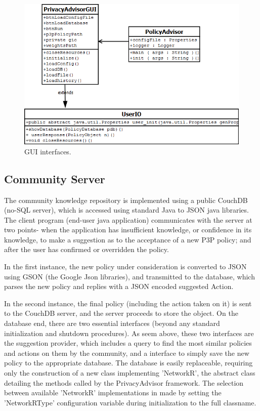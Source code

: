 \begin{figure}[htbp]
\begin{center}
\includegraphics[width = \textwidth]{DesignReport/uml/policyadvisorgui}
\caption{GUI interfaces.}
\label{GUI_interface}
\end{center}
\end{figure}



\subsection{Community Server} %
The community knowledge repository is implemented using a public CouchDB (no-SQL server), which is accessed using standard Java to JSON java libraries. The client program (end-user java application) communicates with the server at two points- when the application has insufficient knowledge, or confidence in its knowledge, to make a suggestion as to the acceptance of a new P3P policy; and after the user has confirmed or overridden the policy.

In the first instance, the new policy under consideration is converted to JSON using GSON (the Google Json libraries), and transmitted to the database, which parses the new policy and replies with a JSON encoded suggested Action.

In the second instance, the final policy (including the action taken on it) is sent to the CouchDB server, and the server proceeds to store the object.
On the database end, there are two essential interfaces (beyond any standard initialization and shutdown procedures). As seem above, these two interfaces are the suggestion provider, which includes a query to find the most similar policies and actions on them by the community, and a interface to simply save the new policy to the appropriate database.
The database is easily replaceable, requiring only the construction of a new class implementing 'NetworkR', the abstract class detailing the methods called by the PrivacyAdvisor framework. The selection between available 'NetworkR' implementations in made by setting the 'NetworkRType' configuration variable during initialization to the full classname.
